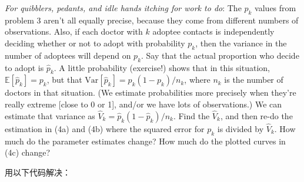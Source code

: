 \documentclass[
]{article}
\newenvironment{Shaded}{\begin{snugshade}}{\end{snugshade}}
\newcommand{\AttributeTok}[1]{\textcolor[rgb]{0.13,0.29,0.53}{#1}}
\newcommand{\CommentTok}[1]{\textcolor[rgb]{0.56,0.35,0.01}{\textit{#1}}}
\newcommand{\ConstantTok}[1]{\textcolor[rgb]{0.56,0.35,0.01}{#1}}
\newcommand{\ControlFlowTok}[1]{\textcolor[rgb]{0.13,0.29,0.53}{\textbf{#1}}}
\newcommand{\DecValTok}[1]{\textcolor[rgb]{0.00,0.00,0.81}{#1}}
\newcommand{\FunctionTok}[1]{\textcolor[rgb]{0.13,0.29,0.53}{\textbf{#1}}}
\newcommand{\NormalTok}[1]{#1}
\newcommand{\OtherTok}[1]{\textcolor[rgb]{0.56,0.35,0.01}{#1}}
\newcommand{\SpecialCharTok}[1]{\textcolor[rgb]{0.81,0.36,0.00}{\textbf{#1}}}
\newcommand{\StringTok}[1]{\textcolor[rgb]{0.31,0.60,0.02}{#1}}
\begin{document}
\emph{For quibblers, pedants, and idle hands itching for work to do}:
The \(p_k\) values from problem 3 aren't all equally precise, because
they come from different numbers of observations. Also, if each doctor
with \(k\) adoptee contacts is independently deciding whether or not to
adopt with probability \(p_k\), then the variance in the number of
adoptees will depend on \(p_k\). Say that the actual proportion who
decide to adopt is \(\hat{p}_k\). A little probability (exercise!) shows
that in this situation, \(\mathbb{E}[\hat{p}_k] = p_k\), but that
\(\mathrm{Var}[\hat{p}_k] = p_k(1-p_k)/n_k\), where \(n_k\) is the
number of doctors in that situation. (We estimate probabilities more
precisely when they're really extreme {[}close to 0 or 1{]}, and/or we
have lots of observations.) We can estimate that variance as
\(\hat{V}_k = \hat{p}_k(1-\hat{p}_k)/n_k\). Find the \(\hat{V}_k\), and
then re-do the estimation in (4a) and (4b) where the squared error for
\(p_k\) is divided by \(\hat{V}_k\). How much do the parameter estimates
change? How much do the plotted curves in (4c) change?

用以下代码解决：

\begin{Shaded}
\end{Shaded}
\end{document}
